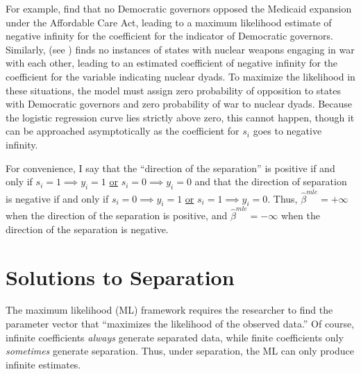 \documentclass[12pt]{article}
\begin{document}
For example, \cite{BarrilleauxRainey2014} find that no Democratic governors opposed the Medicaid expansion under the Affordable Care Act, leading to a maximum likelihood estimate of negative infinity for the coefficient for the indicator of Democratic governors. 
Similarly, \cite{Rauchhaus2009} (see \citealt{BellMiller2015}) finds no instances of states with nuclear weapons engaging in war with each other, leading to an estimated coefficient of negative infinity for the coefficient for the variable indicating nuclear dyads. 
To maximize the likelihood in these situations, the model must assign zero probability of opposition to states with Democratic governors and zero probability of war to nuclear dyads. 
Because the logistic regression curve lies strictly above zero, this cannot happen, though it can be approached asymptotically as the coefficient for $s_i$ goes to negative infinity. 

For convenience, I say that the ``direction of the separation'' is positive if and only if $s_i = 1 \implies y_i = 1$ \underline{or} $s_i = 0 \implies y_i = 0$ and that the direction of separation is negative if and only if $s_i = 0 \implies y_i = 1$ \underline{or} $s_i = 1 \implies y_i = 0$. 
Thus, $\hat{\beta}^{mle} = +\infty$ when the direction of the separation is positive, and $\hat{\beta}^{mle} = -\infty$ when the direction of the separation is negative.

\section*{Solutions to Separation}

The maximum likelihood (ML) framework requires the researcher to find the parameter vector that ``maximizes the likelihood of the observed data.'' 
Of course, infinite coefficients \textit{always} generate separated data, while finite coefficients only \emph{sometimes} generate separation. 
Thus, under separation, the ML can only produce infinite estimates.
\end{document}
